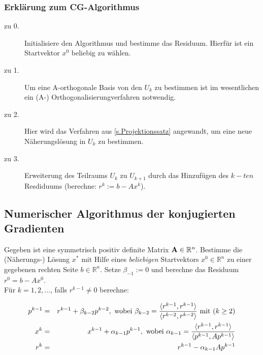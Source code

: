 \subsubsection{Erklärung zum CG-Algorithmus}\label{Erklärung zum CG-Algorithmus}

\begin{description}

\item[zu 0.] Initialisiere den Algorithmus und bestimme das Residuum. Hierfür ist ein Startvektor $x^{0}$ beliebig zu wählen.

\item[zu 1.] Um eine A-orthogonale Basis von den $U_{k}$ zu bestimmen ist im wesentlichen ein (A-) Orthogonalisierungverfahren notwendig.

\item[zu 2.] Hier wird das Verfahren aus \autoref{s.Projektionssatz} angewandt, um eine neue Näherungslösung in $U_{k}$ zu bestimmen.

\item[zu 3.] Erweiterung des Teilraums $U_{k}$ zu $U_{k+1}$ durch das Hinzufügen des $k-ten$ Resdiduums (berechne: $r^{k} := b - Ax^{k}$).

\end{description}

\subsection{Numerischer Algorithmus der konjugierten Gradienten}\label{ss.Numerisches CG}

Gegeben ist eine symmetrisch positiv definite Matrix ${\textbf{A}} \in \mathbb{R}^{n}$. Bestimme die (Näherungs-) Lösung $x^{*}$ mit Hilfe eines \textit{beliebigen} Startvektors $x^{0} \in \mathbb{R}^{n}$ zu einer gegebenen rechten Seite $b \in \mathbb{R}^{n}$. Setze $\beta_{-1} := 0$ und berechne das Residuum $r^{0} = b - Ax^{0}$. \\
Für $k = 1,2,...$, falls $r^{k-1} \ne 0$ berechne:

\begin{eqnarray}
p^{k-1} &=& r^{k-1} + \beta_{k-2}p^{k-2}, \textnormal{ wobei } \beta_{k-2} = \frac {\langle r^{k-1}, r^{k-1} \rangle} {\langle r^{k-2}, r^{k-2} \rangle} \textnormal{ mit } (k \ge 2) \notag \\
x^{k} &=& x^{k-1} + \alpha_{k-1}p^{k-1}, \textnormal{ wobei } \alpha_{k-1} = \frac {\langle r^{k-1}, r^{k-1} \rangle} {\langle p^{k-1}, Ap^{k-1} \rangle} \notag \\
r^{k} &=& r^{k-1} - \alpha_{k-1}Ap^{k-1} \notag
\end{eqnarray}

